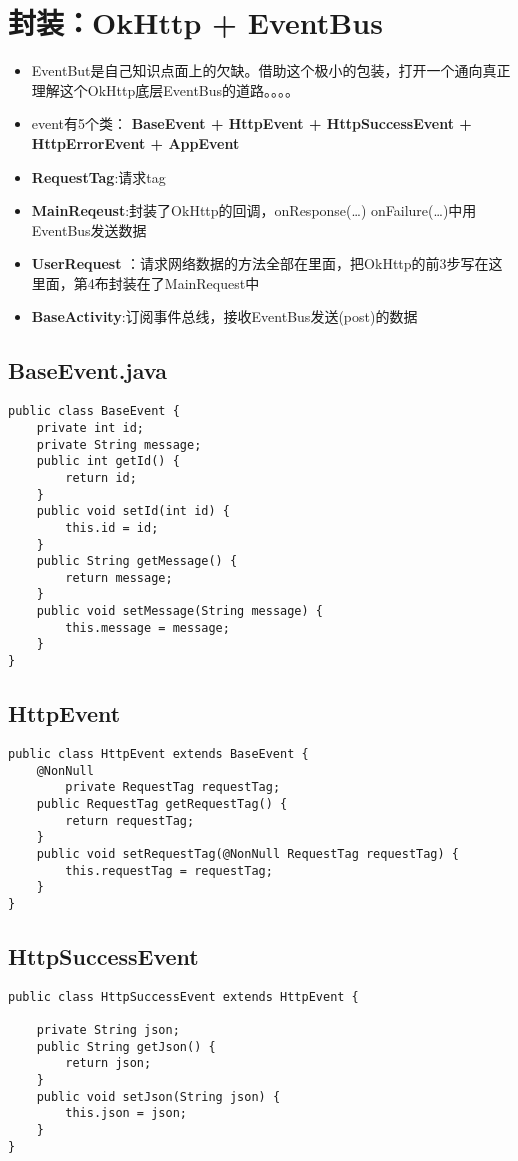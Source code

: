\documentclass[9pt, b5paper]{article}
\begin{document}
\section{封装：OkHttp + EventBus}
\label{sec-4}
\begin{itemize}
\item EventBut是自己知识点面上的欠缺。借助这个极小的包装，打开一个通向真正理解这个OkHttp底层EventBus的道路。。。。
\item event有5个类： \textbf{BaseEvent + HttpEvent + HttpSuccessEvent + HttpErrorEvent + AppEvent}
\item \textbf{RequestTag}:请求tag
\item \textbf{MainReqeust}:封装了OkHttp的回调，onResponse(\ldots{}) onFailure(\ldots{})中用EventBus发送数据
\item \textbf{UserRequest} ：请求网络数据的方法全部在里面，把OkHttp的前3步写在这里面，第4布封装在了MainRequest中
\item \textbf{BaseActivity}:订阅事件总线，接收EventBus发送(post)的数据
\end{itemize}
\subsection{BaseEvent.java}
\label{sec-4-1}
\begin{verbatim}
public class BaseEvent {
    private int id;
    private String message;
    public int getId() {
        return id;
    }
    public void setId(int id) {
        this.id = id;
    }
    public String getMessage() {
        return message;
    }
    public void setMessage(String message) {
        this.message = message;
    }
}
\end{verbatim}
\subsection{HttpEvent}
\label{sec-4-2}
\begin{verbatim}
public class HttpEvent extends BaseEvent {
    @NonNull
        private RequestTag requestTag;
    public RequestTag getRequestTag() {
        return requestTag;
    }
    public void setRequestTag(@NonNull RequestTag requestTag) {
        this.requestTag = requestTag;
    }
}
\end{verbatim}
\subsection{HttpSuccessEvent}
\label{sec-4-3}
\begin{verbatim}
public class HttpSuccessEvent extends HttpEvent {
    
    private String json;
    public String getJson() {
        return json;
    }
    public void setJson(String json) {
        this.json = json;
    }
}
\end{verbatim}
\end{document}
